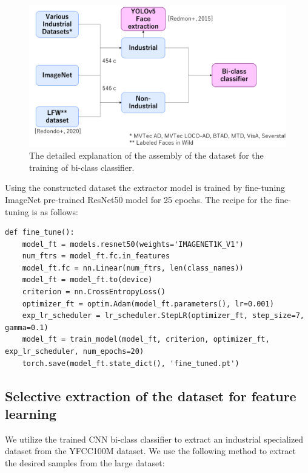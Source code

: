 \begin{figure}[h]
	\begin{center}
		\includegraphics[width=1.0\linewidth]{Chapter_4/bi_class_prep.png}
	\end{center}
	\caption{The detailed explanation of the assembly of the dataset for the training of bi-class classifier.}
	\label{fig:bi_class_prep}
\end{figure}

Using the constructed dataset the extractor model is trained by fine-tuning ImageNet pre-trained ResNet50 model for 25 epochs. The recipe for the fine-tuning is as follows:

\begin{lstlisting}
def fine_tune():
	model_ft = models.resnet50(weights='IMAGENET1K_V1')
	num_ftrs = model_ft.fc.in_features
	model_ft.fc = nn.Linear(num_ftrs, len(class_names))
	model_ft = model_ft.to(device)
	criterion = nn.CrossEntropyLoss()
	optimizer_ft = optim.Adam(model_ft.parameters(), lr=0.001)
	exp_lr_scheduler = lr_scheduler.StepLR(optimizer_ft, step_size=7, gamma=0.1)
	model_ft = train_model(model_ft, criterion, optimizer_ft, exp_lr_scheduler, num_epochs=20)
	torch.save(model_ft.state_dict(), 'fine_tuned.pt')
\end{lstlisting}

\subsection{Selective extraction of the dataset for feature learning}
We utilize the trained CNN bi-class classifier to extract an industrial specialized dataset from the YFCC100M dataset. We use the following method to extract the desired samples from the large dataset:


